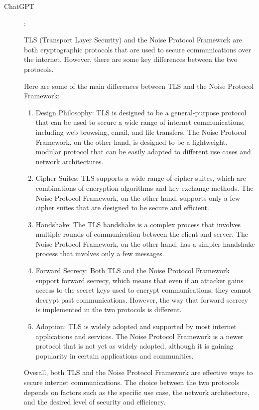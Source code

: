 \begin{description}
\item[ChatGPT]
:

TLS (Transport Layer Security) and the Noise Protocol Framework are both
cryptographic protocols that are used to secure communications over the
internet. However, there are some key differences between the two
protocols.

Here are some of the main differences between TLS and the Noise Protocol
Framework:

\begin{enumerate}
\def\labelenumi{\arabic{enumi}.}
\tightlist
\item
  Design Philosophy: TLS is designed to be a general-purpose protocol
  that can be used to secure a wide range of internet communications,
  including web browsing, email, and file transfers. The Noise Protocol
  Framework, on the other hand, is designed to be a lightweight, modular
  protocol that can be easily adapted to different use cases and network
  architectures.
\item
  Cipher Suites: TLS supports a wide range of cipher suites, which are
  combinations of encryption algorithms and key exchange methods. The
  Noise Protocol Framework, on the other hand, supports only a few
  cipher suites that are designed to be secure and efficient.
\item
  Handshake: The TLS handshake is a complex process that involves
  multiple rounds of communication between the client and server. The
  Noise Protocol Framework, on the other hand, has a simpler handshake
  process that involves only a few messages.
\item
  Forward Secrecy: Both TLS and the Noise Protocol Framework support
  forward secrecy, which means that even if an attacker gains access to
  the secret keys used to encrypt communications, they cannot decrypt
  past communications. However, the way that forward secrecy is
  implemented in the two protocols is different.
\item
  Adoption: TLS is widely adopted and supported by most internet
  applications and services. The Noise Protocol Framework is a newer
  protocol that is not yet as widely adopted, although it is gaining
  popularity in certain applications and communities.
\end{enumerate}

Overall, both TLS and the Noise Protocol Framework are effective ways to
secure internet communications. The choice between the two protocols
depends on factors such as the specific use case, the network
architecture, and the desired level of security and efficiency.
\end{description}

